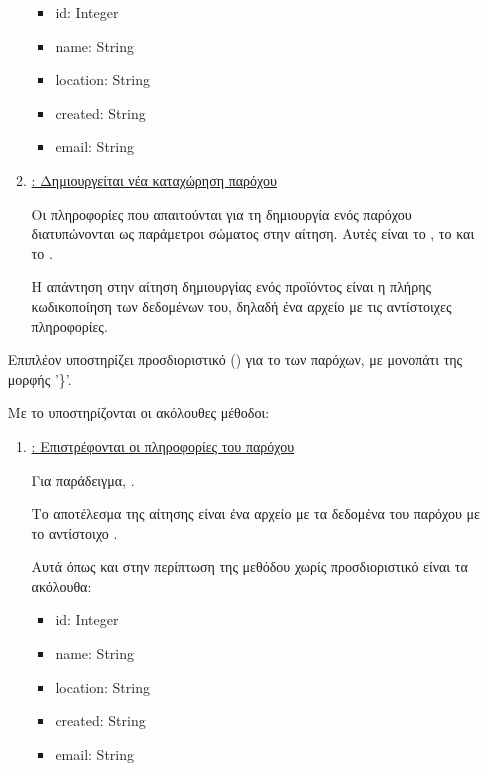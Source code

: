 \begin{itemize}
\begin{enumerate}
        \begin{itemize}
            \item id: Integer
            \item name: String
            \item location: String
            \item created: String
            \item email: String
        \end{itemize}

        \item \underline{\textbf{}: Δημιουργείται νέα καταχώρηση παρόχου}
        
        Οι πληροφορίες που απαιτούνται για τη δημιουργία ενός παρόχου 
        διατυπώνονται ως παράμετροι σώματος στην αίτηση.
        Αυτές είναι το , το  και το .
        
        Η απάντηση στην αίτηση δημιουργίας ενός προϊόντος 
        είναι η πλήρης κωδικοποίηση των δεδομένων του,
        δηλαδή ένα αρχείο  με τις αντίστοιχες πληροφορίες.

    \end{enumerate}

    Επιπλέον υποστηρίζει προσδιοριστικό () για το  των παρόχων,
    με μονοπάτι της μορφής '\}'. 

    Με το  υποστηρίζονται οι ακόλουθες μέθοδοι:

    \begin{enumerate}
        \item \underline{\textbf{}: Επιστρέφονται οι πληροφορίες του παρόχου}
        
        Για παράδειγμα,  \emph{}.

        Το αποτέλεσμα της αίτησης είναι ένα αρχείο 
        με τα δεδομένα του παρόχου με το αντίστοιχο .

        Αυτά όπως και στην περίπτωση της μεθόδου  χωρίς προσδιοριστικό 
        είναι τα ακόλουθα:

        \begin{itemize}
            \item id: Integer
            \item name: String
            \item location: String
            \item created: String
            \item email: String
        \end{itemize}


\end{enumerate}
\end{itemize}
